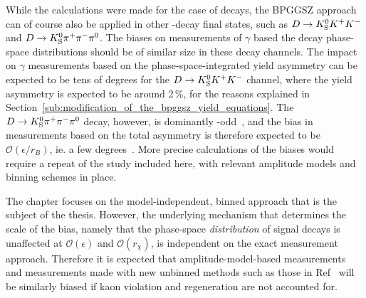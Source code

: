 While the calculations were made for the case of \DtoKspipi decays, the BPGGSZ approach can of course also be applied in other \D-decay final states, such as ${{D}\rightarrow{\ensuremath{{K}^0_{\mathrm{S}}}}{\ensuremath{{K}^+}}{\ensuremath{{K}^-}}}$ and ${D}\rightarrow{\ensuremath{{K}^0_{\mathrm{S}}}}{\ensuremath{{\pi}^+}}{\ensuremath{{\pi}^-}}{\ensuremath{{\pi}^0}}$. The biases on measurements of $\gamma$ based the \D decay phase-space distributions should be of similar size in these decay channels. The impact on $\gamma$ measurements based on the phase-space-integrated yield asymmetry can be expected to be tens of degrees for the ${D}\rightarrow{\ensuremath{{K}^0_{\mathrm{S}}}}{\ensuremath{{K}^+}}{\ensuremath{{K}^-}}$ channel, where the yield asymmetry is expected to be around 2\,\%, for the reasons explained in Section~\ref{sub:modification_of_the_bpggsz_yield_equations}. The ${D}\rightarrow{\ensuremath{{K}^0_{\mathrm{S}}}}{\ensuremath{{\pi}^+}}{\ensuremath{{\pi}^-}}{\ensuremath{{\pi}^0}}$ decay, however, is dominantly \CP-odd~\cite{CLEOKSpipipi0}, and the bias in measurements based on the total asymmetry is therefore expected to be $\mathcal O(\epsilon/r_B)$, ie. a few degrees~\cite{grossmanEffectsBarMixing2014}. More precise calculations of the biases would require a repeat of the study included here, with relevant amplitude models and binning schemes in place.



The chapter focuses on the model-independent, binned approach that is the subject of the thesis. However, the underlying mechanism that determines the scale of the bias, namely that the phase-space \emph{distribution} of signal decays is unaffected at $\mathcal O(\epsilon)$ and $\mathcal O(r_\chi)$, is independent on the exact measurement approach. Therefore it is expected that amplitude-model-based measurements and measurements made with new unbinned methods such as those in Ref~\cite{poluektovUnbinnedModelindependentMeasurements2018} will be similarly biased if kaon \CP violation and regeneration are not accounted for. 



